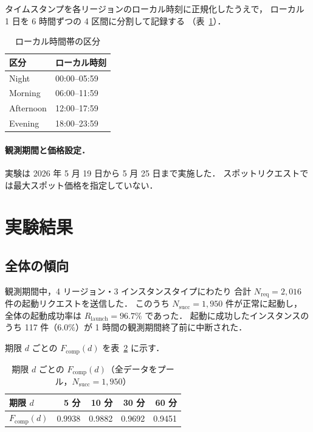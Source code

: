 \documentclass[11pt,a4paper]{ltjsreport}
\newcommand{\Fcomp}{F_{\mathrm{comp}}}
\newcommand{\Rlaunch}{R_{\mathrm{launch}}}
\newcommand{\Nreq}{N_{\mathrm{req}}}
\newcommand{\Nsucc}{N_{\mathrm{succ}}}
\begin{document}
タイムスタンプを各リージョンのローカル時刻に正規化したうえで，
ローカル 1 日を 6 時間ずつの 4 区間に分割して記録する
（表~\ref{tab:periods}）．

\begin{table}[htbp]
\centering
\caption{ローカル時間帯の区分}
\label{tab:periods}
\small
\begin{tabular}{@{}ll@{}}
\toprule
区分 & ローカル時刻 \\
\midrule
Night     & 00:00--05:59 \\
Morning   & 06:00--11:59 \\
Afternoon & 12:00--17:59 \\
Evening   & 18:00--23:59 \\
\bottomrule
\end{tabular}
\end{table}

\paragraph{観測期間と価格設定．}
実験は 2026 年 5 月 19 日から 5 月 25 日まで実施した．
スポットリクエストでは最大スポット価格を指定していない．

\section{実験結果}

\subsection{全体の傾向}

観測期間中，4 リージョン・3 インスタンスタイプにわたり
合計 $\Nreq = 2{,}016$ 件の起動リクエストを送信した．
このうち $\Nsucc = 1{,}950$ 件が正常に起動し，
全体の起動成功率は $\Rlaunch = 96.7\%$ であった．
起動に成功したインスタンスのうち 117 件（$6.0\%$）が
1 時間の観測期間終了前に中断された．

期限 $d$ ごとの $\Fcomp(d)$ を表~\ref{tab:fcomp_overall} に示す．

\begin{table}[htbp]
\centering
\caption{期限 $d$ ごとの $\Fcomp(d)$（全データをプール，$\Nsucc = 1{,}950$）}
\label{tab:fcomp_overall}
\small
\begin{tabular}{@{}lrrrr@{}}
\toprule
期限 $d$ & 5 分 & 10 分 & 30 分 & 60 分 \\
\midrule
$\Fcomp(d)$ & 0.9938 & 0.9882 & 0.9692 & 0.9451 \\
\bottomrule
\end{tabular}
\end{table}
\end{document}
